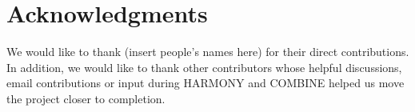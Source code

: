 
\section{Acknowledgments}

We would like to thank (insert people's names here) for their direct contributions. In addition, we would like to thank other contributors whose helpful discussions, email contributions or input during HARMONY and COMBINE helped us move the project closer to completion.